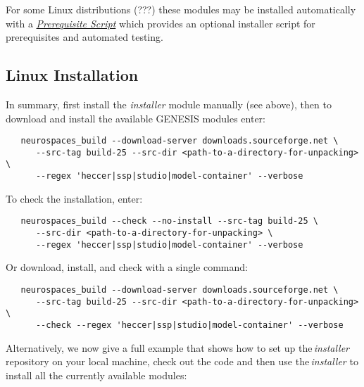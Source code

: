 \documentclass[12pt]{article}
\begin{document}
For some Linux distributions (???) these modules may be installed automatically with a \href{../prerequisite-script/prerequisite-script.pdf}{\it Prerequisite Script} which provides an optional installer script for prerequisites and automated testing.

\subsection*{Linux Installation}

In summary, first install the {\it installer} module manually (see above), then to download and install the available GENESIS modules enter:
\begin{verbatim}
   neurospaces_build --download-server downloads.sourceforge.net \
      --src-tag build-25 --src-dir <path-to-a-directory-for-unpacking> \
      --regex 'heccer|ssp|studio|model-container' --verbose
\end{verbatim}
To check the installation, enter:
\begin{verbatim}
   neurospaces_build --check --no-install --src-tag build-25 \
      --src-dir <path-to-a-directory-for-unpacking> \
      --regex 'heccer|ssp|studio|model-container' --verbose
\end{verbatim}
Or download, install, and check with a single command:
\begin{verbatim}
   neurospaces_build --download-server downloads.sourceforge.net \
      --src-tag build-25 --src-dir <path-to-a-directory-for-unpacking> \
      --check --regex 'heccer|ssp|studio|model-container' --verbose
\end{verbatim}

Alternatively, we now give a full example that shows how to set up the\,{\it installer} repository on your local machine, check out the code and then use the\,{\it installer} to install all the currently available modules:
\end{document}

